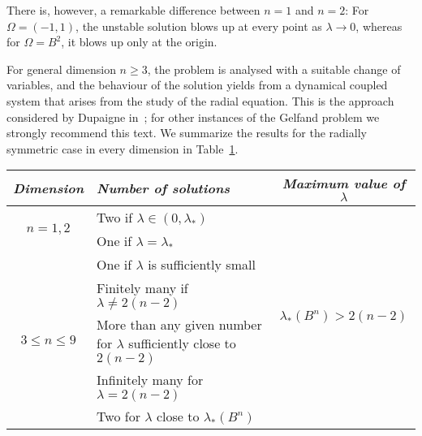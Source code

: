 There is, however, a remarkable difference between $n=1$ and $n=2$: For
$\Omega=(-1,1)$, the unstable solution blows up at every point as $\lambda\to
0$, whereas for $\Omega=B^2$, it blows up only at the origin.
\medskip

For general dimension $n\geq 3$, the problem is analysed with a suitable change
of variables, and the behaviour of the solution yields from a dynamical coupled
system that arises from the study of the radial equation. This is the approach
considered by Dupaigne in~\cite{stable-solutions-elliptic}; for other
instances of the Gelfand problem we strongly recommend this text. We summarize
the results for the radially symmetric case in every dimension in Table~\ref{table:bifurcation-ball}.

\begin{table}[ht!]\label{table:bifurcation-ball}
    \center\renewcommand{\arraystretch}{1.2}
    \begin{tabular}{c|p{}|c}
        \midrule
        \textit{Dimension}                 & \textit{Number of solutions}                                            & \textit{Maximum value of $\lambda$}                  \\ \midrule
        \multirow{2}{*}{$n=1,2$}           & Two if $\lambda\in(0,\lambda_\ast)$                                     & \multirow{8}{*}{$\lambda_\ast(B^n)>2(n-2)$} \\ \cline{2-2}
                                           & One if $\lambda=\lambda_\ast$                                           &                                             \\ \cline{1-2}
        \multirow{6}{*}{$3\leq n  \leq 9$} & One if $\lambda$ is sufficiently small                                  &                                             \\ \cline{2-2}
                                           & Finitely many if $\lambda\neq 2(n-2)$                                   &                                             \\ \cline{2-2}
                                           & More than any given number for $\lambda$ sufficiently close to $2(n-2)$ &                                             \\ \cline{2-2}
                                           & Infinitely many for $\lambda = 2(n-2)$                                  &                                             \\ \cline{2-2}
                                           & Two for $\lambda$ close to $\lambda_\ast(B^n)$                          &                                             \\ \cline{2-2}

\end{tabular}
\end{table}
